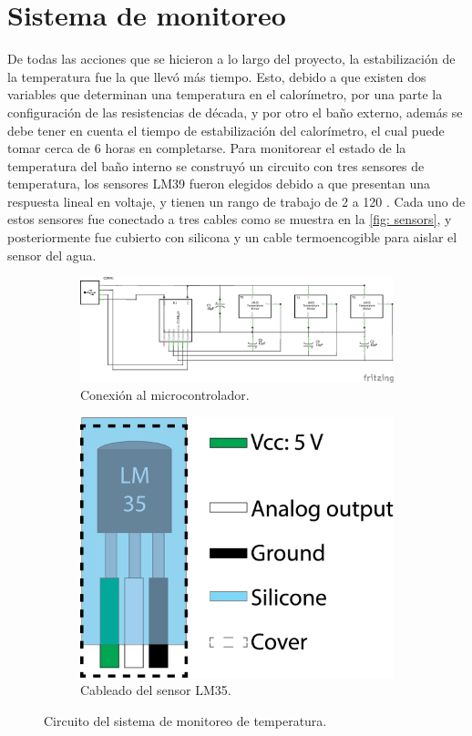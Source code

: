 	\section{Sistema de monitoreo}
	De todas las acciones que se hicieron a lo largo del proyecto, la estabilizaci\'on de la temperatura fue la que llev\'o m\'as tiempo. Esto, debido a que existen dos variables que determinan una temperatura en el calor\'imetro, por una parte la configuraci\'on de las resistencias de d\'ecada, y por otro el ba\~no externo, adem\'as se debe tener en cuenta el tiempo de estabilizaci\'on del calor\'imetro, el cual puede tomar cerca de 6 horas en completarse. Para monitorear el estado de la temperatura del ba\~no interno se construy\'o un circuito con tres sensores de temperatura, los sensores LM39 fueron elegidos debido a que presentan una respuesta lineal en voltaje, y tienen un rango de trabajo de 2 \grad{} a 120 \grad{} \cite{instruments1999lm35}. Cada uno de estos sensores fue conectado a tres cables como se muestra en la \autoref{fig: sensors}, y posteriormente fue cubierto con silicona y un cable termoencogible para aislar el sensor del agua. 	
	\begin{figure}[h]
		\centering
		\begin{subfigure}{0.75\textwidth}
			\includegraphics[width=\linewidth]{Figures/Sketch_schem}
			\caption{Conexi\'on al microcontrolador.}
			\label{fig: circuito}
		\end{subfigure}
		\begin{subfigure}{0.23\textwidth}
			\includegraphics[width=\linewidth]{Figures/Sensor}
			\caption{Cableado del sensor LM35.}	
			\label{fig: sensors}
		\end{subfigure}
		\caption{Circuito del sistema de monitoreo de temperatura.}	
	\end{figure}

